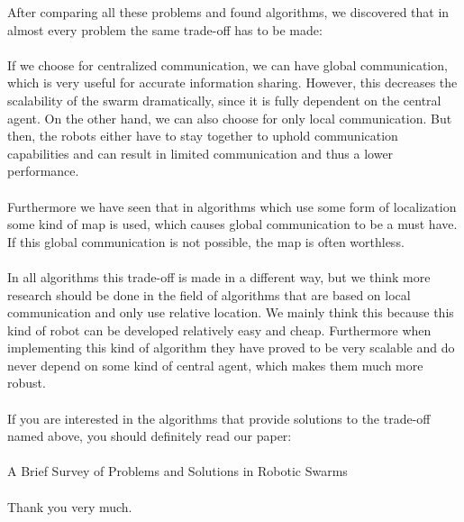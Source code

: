 \documentclass[a4paper]{article}
\begin{document}
After comparing all these problems and found algorithms, we discovered that in almost every problem the same trade-off has to be made:\\
\\
If we choose for centralized communication, we can have global communication, which is very useful for accurate information sharing. 
However, this decreases the scalability of the swarm dramatically, since it is fully dependent on the central agent. 
On the other hand, we can also choose for only local communication.
But then, the robots either have to stay together to uphold communication capabilities and can result in limited communication and thus a lower performance.\\
\\
Furthermore we have seen that in algorithms which use some form of localization some kind of map is used, which causes global communication to be a must have. 
If this global communication is not possible, the map is often worthless.\\
\\
In all algorithms this trade-off is made in a different way, but we think more research should be done in the field of algorithms that are based on local communication and only use relative location. 
We mainly think this because this kind of robot can be developed relatively easy and cheap. 
Furthermore when implementing this kind of algorithm they have proved to be very scalable and do never depend on some kind of central agent, which makes them much more robust.\\
\\
If you are interested in the algorithms that provide solutions to the trade-off named above, you should definitely read our paper:\\
\\
A Brief Survey of Problems and Solutions in Robotic Swarms\\
\\
Thank you very much.
\end{document}
